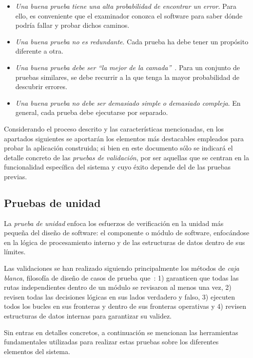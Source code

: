 \begin{itemize}
	\item \textit{Una buena prueba tiene una alta probabilidad de encontrar un error}. Para ello, es conveniente que el examinador conozca el software para saber dónde podría fallar y probar dichos caminos.
	\item \textit{Una buena prueba no es redundante}. Cada prueba ha debe tener un propósito diferente a otra.
	\item \textit{Una buena prueba debe ser ``la mejor de la camada''}~\cite{Kan99}. Para un conjunto de pruebas similares, se debe recurrir a la que tenga la mayor probabilidad de descubrir errores.
	\item \textit{Una buena prueba no debe ser demasiado simple o demasiado compleja}. En general, cada prueba debe ejecutarse por separado.
\end{itemize}

Considerando el proceso descrito y las características mencionadas, en los apartados siguientes se aportarán los elementos más destacables empleados para probar la aplicación construida; si bien en este documento sólo se indicará el detalle concreto de las \emph{pruebas de validación}, por ser aquellas que se centran en la funcionalidad específica del sistema y cuyo éxito depende del de las pruebas previas.

\subsection{Pruebas de unidad}

La \emph{prueba de unidad} enfoca los esfuerzos de verificación en la unidad más pequeña del diseño de software: el componente o módulo de software, enfocándose en la lógica de procesamiento interno y de las estructuras de datos dentro de sus límites.

Las validaciones se han realizado siguiendo principalmente los métodos de \emph{caja blanca}, filosofía de diseño de casos de prueba que~\cite{Pre10}: 1) garanticen que todas las rutas independientes dentro de un módulo se revisaron al menos una vez, 2) revisen todas las decisiones lógicas en sus lados verdadero y falso, 3) ejecuten todos los bucles en sus fronteras y dentro de sus fronteras operativas y 4) revisen estructuras de datos internas para garantizar su validez.

Sin entras en detalles concretos, a continuación se mencionan las herramientas fundamentales utilizadas para realizar estas pruebas sobre los diferentes elementos del sistema.

